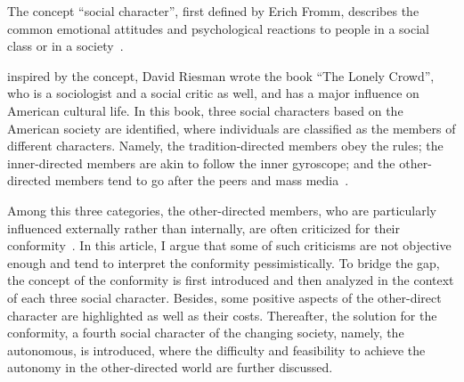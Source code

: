 
The concept ``social character'', first defined by Erich Fromm, describes the common emotional attitudes and psychological reactions to people in a social class or in a society~\citep{fromm1941escape}. 

inspired by the concept, David Riesman wrote the book ``The Lonely Crowd'', who is a sociologist and a social critic as well, and has a
major influence on American cultural life. In this book, three social characters based on the American society are identified, where individuals are classified as the members of different characters. Namely, the tradition-directed members obey the rules; the inner-directed members are akin to follow the inner gyroscope; and the other-directed members tend to go after the peers and mass media~\citep{riesman2001lonely}. 

Among this three categories, the other-directed members, who are particularly influenced externally rather than internally, are often criticized for their conformity~\citep{mcclay1998lonely}. In this article, I argue that some of such criticisms are not objective enough and tend to interpret the conformity pessimistically. To bridge the gap, the concept of the conformity is first introduced and then analyzed in the context of each three social character. Besides, some positive aspects of the other-direct character are highlighted as well as their costs. Thereafter, the solution for the conformity, a fourth social character of the changing society, namely, the autonomous, is introduced, where the difficulty and feasibility to achieve the autonomy in the other-directed world are further discussed. 



